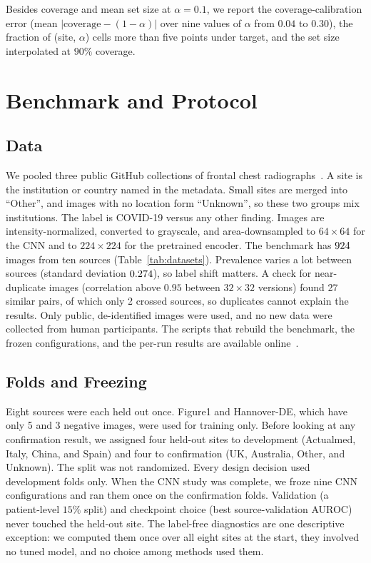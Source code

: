 \documentclass[journal]{IEEEtran}
\newcommand{\tabnote}[1]{\par\vspace{3pt}{\footnotesize\raggedright #1\par}}
\newcommand{\tabin}[1]{}
\begin{document}
Besides coverage and mean set size at $\alpha=0.1$, we report the coverage-calibration error (mean $|\text{coverage}-(1-\alpha)|$ over nine values of $\alpha$ from $0.04$ to $0.30$), the fraction of (site, $\alpha$) cells more than five points under target, and the set size interpolated at $90\%$ coverage.

\section{Benchmark and Protocol}\label{sec:protocol}
\subsection{Data}\label{sec:data}
We pooled three public GitHub collections of frontal chest radiographs~\cite{cohen2020covid,chung2020actualmed,chung2020figure1}. A site is the institution or country named in the metadata. Small sites are merged into ``Other'', and images with no location form ``Unknown'', so these two groups mix institutions. The label is COVID-19 versus any other finding. Images are intensity-normalized, converted to grayscale, and area-downsampled to $64\times64$ for the CNN and to $224\times224$ for the pretrained encoder. The benchmark has $924$ images from ten sources (Table~\ref{tab:datasets}). Prevalence varies a lot between sources (standard deviation $0.274$), so label shift matters. A check for near-duplicate images (correlation above $0.95$ between $32\times32$ versions) found 27 similar pairs, of which only 2 crossed sources, so duplicates cannot explain the results. Only public, de-identified images were used, and no new data were collected from human participants. The scripts that rebuild the benchmark, the frozen configurations, and the per-run results are available online~\cite{rao2026sidlcode}.
\begin{table}[!t]\centering\footnotesize
\caption{Benchmark Composition}\label{tab:datasets}
\tabin{datasets.tex}
\tabnote{Role is the fold role when the source is held out. Figure1 and Hannover-DE have too few negatives and are used only for training.}
\end{table}

\subsection{Folds and Freezing}\label{sec:folds}
Eight sources were each held out once. Figure1 and Hannover-DE, which have only 5 and 3 negative images, were used for training only. Before looking at any confirmation result, we assigned four held-out sites to development (Actualmed, Italy, China, and Spain) and four to confirmation (UK, Australia, Other, and Unknown). The split was not randomized. Every design decision used development folds only. When the CNN study was complete, we froze nine CNN configurations and ran them once on the confirmation folds. Validation (a patient-level $15\%$ split) and checkpoint choice (best source-validation AUROC) never touched the held-out site. The label-free diagnostics are one descriptive exception: we computed them once over all eight sites at the start, they involved no tuned model, and no choice among methods used them.
\end{document}
